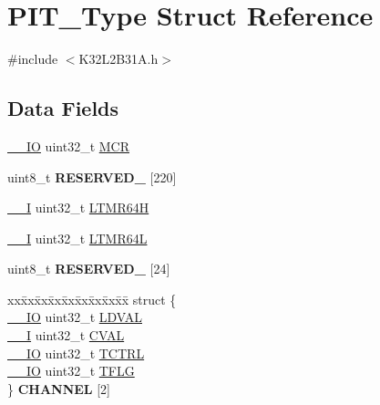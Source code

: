 \hypertarget{struct_p_i_t___type}{}\section{P\+I\+T\+\_\+\+Type Struct Reference}
\label{struct_p_i_t___type}


{\ttfamily \#include $<$K32\+L2\+B31\+A.\+h$>$}

\subsection*{Data Fields}
\begin{DoxyCompactItemize}
\item 
\mbox{\hyperlink{core__cm0plus_8h_aec43007d9998a0a0e01faede4133d6be}{\+\_\+\+\_\+\+IO}} uint32\+\_\+t \mbox{\hyperlink{struct_p_i_t___type_a27af4e9f888f0b7b1e8da7e002d98798}{M\+CR}}
\item 
\mbox{\label{struct_p_i_t___type_a3964851a29318d7b51030db55fb714ae}} 
uint8\+\_\+t {\bfseries R\+E\+S\+E\+R\+V\+E\+D\+\_} \mbox{[}220\mbox{]}
\item 
\mbox{\hyperlink{core__cm0plus_8h_af63697ed9952cc71e1225efe205f6cd3}{\+\_\+\+\_\+I}} uint32\+\_\+t \mbox{\hyperlink{struct_p_i_t___type_ae4123169fcefb48b1be09b131cbbbd51}{L\+T\+M\+R64H}}
\item 
\mbox{\hyperlink{core__cm0plus_8h_af63697ed9952cc71e1225efe205f6cd3}{\+\_\+\+\_\+I}} uint32\+\_\+t \mbox{\hyperlink{struct_p_i_t___type_a350a7f2bc07234049109e960348ae22c}{L\+T\+M\+R64L}}
\item 
\mbox{\label{struct_p_i_t___type_a53762b5329df1577d65fb443ec732a11}} 
uint8\+\_\+t {\bfseries R\+E\+S\+E\+R\+V\+E\+D\+\_} \mbox{[}24\mbox{]}
\item 
\mbox{\label{struct_p_i_t___type_adc663f2968ce70178904883f3f694eb2}} 
\begin{tabbing}
xx\=xx\=xx\=xx\=xx\=xx\=xx\=xx\=xx\=\kill
struct \{\\
\>\mbox{\hyperlink{core__cm0plus_8h_aec43007d9998a0a0e01faede4133d6be}{\_\_IO}} uint32\_t \mbox{\hyperlink{struct_p_i_t___type_a7066d020800ce5572217b4dd7be33245}{LDVAL}}\\
\>\mbox{\hyperlink{core__cm0plus_8h_af63697ed9952cc71e1225efe205f6cd3}{\_\_I}} uint32\_t \mbox{\hyperlink{struct_p_i_t___type_ad4fcb6f0bd4cbbc890593eeb21152a92}{CVAL}}\\
\>\mbox{\hyperlink{core__cm0plus_8h_aec43007d9998a0a0e01faede4133d6be}{\_\_IO}} uint32\_t \mbox{\hyperlink{struct_p_i_t___type_ad205d7250cea8af8b177be3e861193d8}{TCTRL}}\\
\>\mbox{\hyperlink{core__cm0plus_8h_aec43007d9998a0a0e01faede4133d6be}{\_\_IO}} uint32\_t \mbox{\hyperlink{struct_p_i_t___type_a38fdb1e5ac5dd95a6f67e651ded71276}{TFLG}}\\
\} {\bfseries CHANNEL} \mbox{[}2\mbox{]}\\

\end{tabbing}\end{DoxyCompactItemize}


